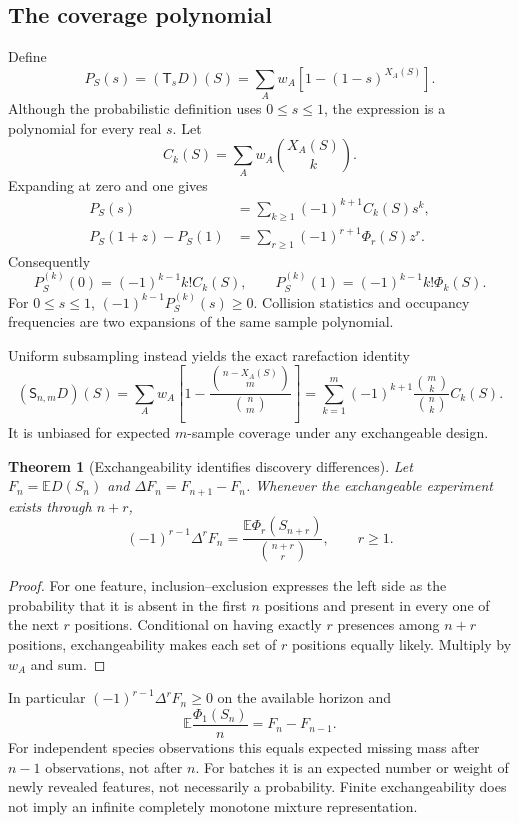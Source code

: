 \documentclass[11pt]{article}
\numberwithin{equation}{section}
\newtheorem{theorem}{Theorem}[section]
\theoremstyle{definition}
\theoremstyle{remark}
\newcommand{\E}{\mathbb E}
\newcommand{\Scal}{\mathsf S}
\newcommand{\Tcal}{\mathsf T}
\begin{document}
\subsection{The coverage polynomial}
Define
\begin{equation}\label{eq:coveragepoly}
 P_S(s)=(\Tcal_sD)(S)=\sum_Aw_A[1-(1-s)^{X_A(S)}].
\end{equation}
Although the probabilistic definition uses $0\le s\le1$, the expression is a polynomial for every real $s$. Let
\[
 C_k(S)=\sum_Aw_A\binom{X_A(S)}k.
\]
Expanding at zero and one gives
\begin{align}
 P_S(s)&=\sum_{k\ge1}(-1)^{k+1}C_k(S)s^k,\label{eq:collisionexp}\\
 P_S(1+z)-P_S(1)&=\sum_{r\ge1}(-1)^{r+1}\Phi_r(S)z^r.\label{eq:fingerexp}
\end{align}
Consequently
\[
 P_S^{(k)}(0)=(-1)^{k-1}k!C_k(S),\qquad
 P_S^{(k)}(1)=(-1)^{k-1}k!\Phi_k(S).
\]
For $0\le s\le1$, $(-1)^{k-1}P_S^{(k)}(s)\ge0$. Collision statistics and occupancy frequencies are two expansions of the same sample polynomial.

Uniform subsampling instead yields the exact rarefaction identity
\begin{equation}\label{eq:rarefaction}
 (\Scal_{n,m}D)(S)=\sum_Aw_A
 \left[1-\frac{\binom{n-X_A(S)}m}{\binom nm}\right]
 =\sum_{k=1}^m(-1)^{k+1}\frac{\binom mk}{\binom nk}C_k(S).
\end{equation}
It is unbiased for expected $m$-sample coverage under any exchangeable design.

\begin{theorem}[Exchangeability identifies discovery differences]\label{thm:differences}
Let $F_n=\E D(S_n)$ and $\Delta F_n=F_{n+1}-F_n$. Whenever the exchangeable experiment exists through $n+r$,
\begin{equation}\label{eq:diffidentity}
 (-1)^{r-1}\Delta^rF_n
 =\frac{\E\Phi_r(S_{n+r})}{\binom{n+r}r},\qquad r\ge1.
\end{equation}
\end{theorem}
\begin{proof}
For one feature, inclusion--exclusion expresses the left side as the probability that it is absent in the first $n$ positions and present in every one of the next $r$ positions. Conditional on having exactly $r$ presences among $n+r$ positions, exchangeability makes each set of $r$ positions equally likely. Multiply by $w_A$ and sum.
\end{proof}
In particular $(-1)^{r-1}\Delta^rF_n\ge0$ on the available horizon and
\begin{equation}\label{eq:GTshift}
 \E\frac{\Phi_1(S_n)}n=F_n-F_{n-1}.
\end{equation}
For independent species observations this equals expected missing mass after $n-1$ observations, not after $n$. For batches it is an expected number or weight of newly revealed features, not necessarily a probability. Finite exchangeability does not imply an infinite completely monotone mixture representation.
\end{document}
